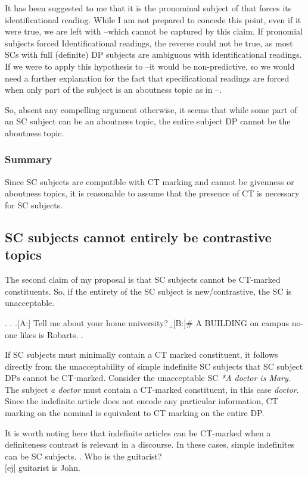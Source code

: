 \documentclass[GPFinal]{subfiles}
\begin{document}
It has been suggested to me that it is the pronominal subject of \Last[a] that forces its identificational reading.
While I am not prepared to concede this point, even if it were true, we are left with \Last[b]--\Last[d] which cannot be captured by this claim.
If pronomial subjects forced Identificational readings, the reverse could not be true, as most SCs with full (definite) DP subjects are ambiguous with identificational readings.
If we were to apply this hypothesis to \Last[b]--\Last[d] it would be non-predictive, so we would need a further explanation for the fact that specificational readings are forced when only part of the subject is an aboutness topic as in \Last[b]--\Last[d].

So, absent any compelling argument otherwise, it seems that while some part of an SC subject can be an aboutness topic, the entire subject DP cannot be the aboutness topic.

\subsubsection{Summary}
Since SC subjects are compatible with CT marking and cannot be givenness or aboutness topics, it is reasonable to assume that the presence of CT is necessary for SC subjects.
\subsection{SC subjects cannot entirely be contrastive topics}
The second claim of my proposal is that SC subjects cannot be CT-marked constituents.
So, if the entirety of the SC subject is new/contrastive, the SC is unacceptable.

\ex.
\a.
\a.[A:] Tell me about your home university?
\b.[B:]\# A BUILDING on campus no-one likes is Robarts.
\z.

If SC subjects must minimally contain a CT marked constituent, it follows directly from the unacceptability of simple indefinite SC subjects that SC subject DPs cannot be CT-marked.
Consider the unacceptable SC \textit{*A doctor is Mary}.
The subject \textit{a doctor} must contain a CT-marked constituent, in this case \textit{doctor}.
Since the indefinite article does not encode any particular information, CT marking on the nominal is equivalent to CT marking on the entire DP.

It is worth noting here that indefinite articles can be CT-marked when a definiteness contrast is relevant in a discourse.
In these cases, simple indefinites can be SC subjects.
\ex. Who is the guitarist?\\
$[$ej$]$ guitarist is John.
\end{document}
